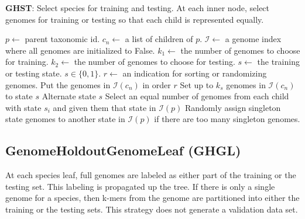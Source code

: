\documentclass[12pt, letterpaper]{article}
\begin{document}
\begin{algorithm}[h!]
\caption{\textbf{GHST}: Select species for training and testing.  At each inner node, select genomes for training or testing so that each child is represented equally.}
\label{GHST}
\begin{algorithmic}
\State $p \gets$ parent taxonomic id.
\State $c_n \gets$ a list of children of $p$.
\State $\mathcal{I} \gets$ a genome index where all genomes are initialized to False.
\State $k_1 \gets$ the number of genomes to choose for training.
\State $k_2 \gets$ the number of genomes to choose for testing.
\State $s \gets$ the training or testing state.  $s \in \{0, 1\}$.
\State $r \gets$ an indication for sorting or randomizing genomes.
 
\State Put the genomes in $\mathcal{I}(c_n)$ in order $r$
\State Set up to $k_s$ genomes in $\mathcal{I}(c_n)$ to state $s$
\State Alternate state $s$
\Else {}
\State Select an equal number of genomes from each child with state $s_i$ and given them that state in $\mathcal{I}(p)$
\State Randomly assign singleton state genomes to another state in $\mathcal{I}(p)$ if there are too many singleton genomes.
\EndFor
\EndIf
\EndProcedure
\end{algorithmic}
\end{algorithm}

\newpage

\subsection{GenomeHoldoutGenomeLeaf (GHGL)}
 At each species leaf, full genomes are labeled as either part of the training or the testing set.  This labeling is propagated up the tree.  If there is only a single genome for a species, then k-mers from the genome are partitioned into either the training or the testing sets.  This strategy does not generate a validation data set.
\end{document}
